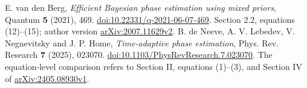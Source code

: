 E. van den Berg, \emph{Efficient Bayesian phase estimation using mixed
priors}, Quantum \textbf{5} (2021), 469.
\href{https://doi.org/10.22331/q-2021-06-07-469}{doi:10.22331/q-2021-06-07-469}.
Section 2.2, equations (12)--(15); author version
\href{https://arxiv.org/abs/2007.11629v2}{arXiv:2007.11629v2}.
B. de Neeve, A. V. Lebedev, V. Negnevitsky and J. P. Home,
\emph{Time-adaptive phase estimation}, Phys. Rev. Research
\textbf{7} (2025), 023070.
\href{https://doi.org/10.1103/PhysRevResearch.7.023070}{doi:10.1103/PhysRevResearch.7.023070}.
The equation-level comparison refers to Section II, equations (1)--(3),
and Section IV of \href{https://arxiv.org/html/2405.08930v1}{arXiv:2405.08930v1}.
